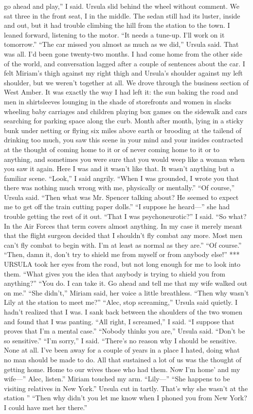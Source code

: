 \documentclass{novel}
\begin{document}
go ahead and play,” I said. Ursula slid behind the wheel without comment. We sat three in the front seat, I in the middle. The sedan still had its luster, inside and out, but it had trouble climbing the hill from the station to the town. I leaned forward, listening to the motor. “It needs a tune-up. I’ll work on it tomorrow.” “The car missed you almost as much as we did,” Ursula said. That was all. I’d been gone twenty-two months. I had come home from the other side of the world, and conversation lagged after a couple of sentences about the car. I felt Miriam’s thigh against my right thigh and Ursula’s shoulder against my left shoulder, but we weren’t together at all. We drove through the business section of West Amber. It was exactly the way I had left it: the sun baking the road and men in shirtsleeves lounging in the shade of storefronts and women in slacks wheeling baby carriages and children playing box games on the sidewalk and cars searching for parking space along the curb. Month after month, lying in a sticky bunk under netting or flying six miles above earth or brooding at the tailend of drinking too much, you saw this scene in your mind and your insides contracted at the thought of coming home to it or of never coming home to it or to anything, and sometimes you were sure that you would weep like a woman when you saw it again. Here I was and it wasn’t like that. It wasn’t anything but a familiar scene. “Look,” I said angrily. “When I was grounded, I wrote you that there was nothing much wrong with me, physically or mentally.” “Of course,” Ursula said. “Then what was Mr. Spencer talking about? He seemed to expect me to get off the train cutting paper dolls.” “I suppose he heard—” she had trouble getting the rest of it out. “That I was psychoneurotic?” I said. “So what? In the Air Forces that term covers almost anything. In my case it merely meant that the flight surgeon decided that I shouldn’t fly combat any more. Most men can’t fly combat to begin with. I’m at least as normal as they are.” “Of course.” “Then, damn it, don’t try to shield me from myself or from anybody else!” *** URSULA took her eyes from the road, but not long enough for me to look into them. “What gives you the idea that anybody is trying to shield you from anything?” “You do. I can take it. Go ahead and tell me that my wife walked out on me.” “She didn’t,” Miriam said, her voice a little breathless. “Then why wasn’t Lily at the station to meet me?” “Alec, stop screaming,” Ursula said quietly. I hadn’t realized that I was. I sank back between the shoulders of the two women and found that I was panting. “All right, I screamed,” I said. “I suppose that proves that I’m a mental case.” “Nobody thinks you are,” Ursula said. “Don’t be so sensitive.” “I’m sorry,” I said. “There’s no reason why I should be sensitive. None at all. I’ve been away for a couple of years in a place I hated, doing what no man should be made to do. All that sustained a lot of us was the thought of getting home. Home to our wives those who had them. Now I’m home’ and my wife—” Alec, listen.” Miriam touched my arm. “Lily—” “She happens to be visiting relatives in New York.” Ursula cut in tartly. That’s why she wasn’t at the station ” “Then why didn’t you let me know when I phoned you from New York? I could have met her there.” 
\end{document}
